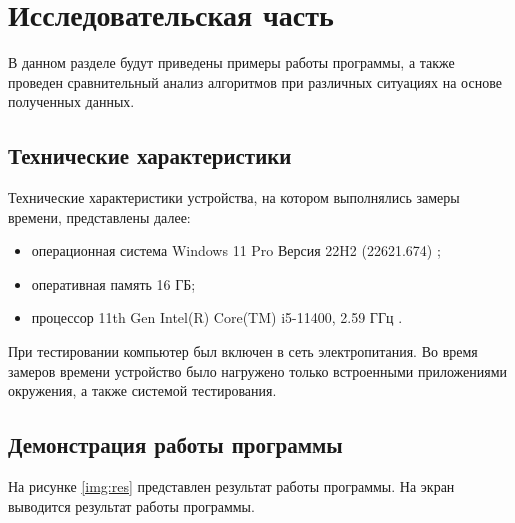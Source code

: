 \chapter{Исследовательская часть}

В данном разделе будут приведены примеры работы программы, а также проведен сравнительный анализ алгоритмов при различных ситуациях на основе полученных данных.

\section{Технические характеристики}

Технические характеристики устройства, на котором выполнялись замеры времени, представлены далее:

\begin{itemize}
	\item операционная система Windows 11 Pro Версия 22H2 (22621.674) \cite{wind};
	\item оперативная память 16 ГБ;
	\item процессор 11th Gen Intel(R) Core(TM) i5-11400, 2.59 ГГц \cite{proc}.
\end{itemize}

При тестировании компьютер был включен в сеть электропитания. Во время замеров времени устройство было нагружено только встроенными приложениями окружения, а также системой тестирования.

\section{Демонстрация работы программы}

На рисунке \ref{img:res} представлен результат работы программы. На экран выводится результат работы программы.
\newpage
%
\begin{center}
	\label{img:res}
\end{center}


